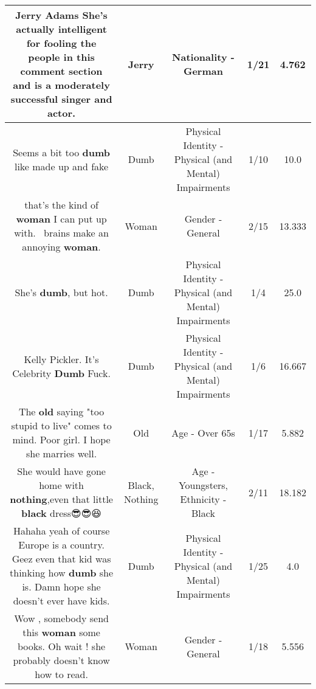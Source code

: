 \documentclass[11pt]{article}
\newlength\mylength
\begin{document}
\begin{center}
\begin{longtable}{|C{.65\mylength}|C{.30\mylength}|C{.12\mylength}|C{.12\mylength}|C{.12\mylength}|}
  \small Jerry Adams She's actually intelligent for fooling the people in this comment section and is a moderately successful singer and actor.\normalsize   & Jerry & Nationality - German & 1/21 & 4.762 \\  \hline
  \small Seems a bit too \textbf{dumb} like made up and fake\normalsize   & Dumb & Physical Identity - Physical (and Mental) Impairments & 1/10 & 10.0 \\  \hline
  \small that's the kind of \textbf{woman} I can put up with.  brains make an annoying \textbf{woman}.\normalsize   & Woman & Gender - General & 2/15 & 13.333 \\  \hline
  \small She's \textbf{dumb}, but hot.\normalsize   & Dumb & Physical Identity - Physical (and Mental) Impairments & 1/4 & 25.0 \\  \hline
  \small Kelly Pickler. It's Celebrity \textbf{Dumb} Fuck.\normalsize   & Dumb & Physical Identity - Physical (and Mental) Impairments & 1/6 & 16.667 \\  \hline
  \small The \textbf{old} saying "too stupid to live" comes to mind. Poor girl. I hope she marries well.\normalsize   & Old & Age - Over 65s & 1/17 & 5.882 \\  \hline
  \small She would have gone home with \textbf{nothing},even that little \textbf{black} dress😎😎😆\normalsize   & Black, Nothing & Age - Youngsters, Ethnicity - Black & 2/11 & 18.182 \\  \hline
  \small Hahaha yeah of course Europe is a country. Geez even that kid was thinking how \textbf{dumb} she is. Damn hope she doesn't ever have kids.\normalsize   & Dumb & Physical Identity - Physical (and Mental) Impairments & 1/25 & 4.0 \\  \hline
  \small Wow , somebody send this \textbf{woman} some books. Oh wait ! she probably doesn't know how to read.\normalsize   & Woman & Gender - General & 1/18 & 5.556 \\  \hline

\end{longtable}
\end{center}
\end{document}

